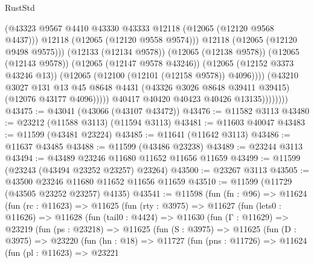 \begin{lexlean}{RustStd}
\begin{coremodule}
                                  (@43323
                                    @9567
                                    @4410
                                    @43330
                                    @43333
                                    @12118
                                    (@12065 (@12120 @9568 @4437)))
                                  @12118
                                  (@12065 (@12120 @9558 @9574)))
                                @12118
                                (@12065 (@12120 @9498 @9575)))
                              (@12133 (@12134 @9578))
                              (@12065 (@12138 @9578))
                              (@12065 (@12143 @9578))
                              (@12065 (@12147 @9578 @43246))
                              (@12065 (@12152 @3373 @43246 @13))
                              (@12065 (@12100 (@12101 (@12158 @9578)) @4096))))
                          (@43210
                            @3027
                            @131
                            @13
                            @45
                            @8648
                            @4431
                            (@43326 @3026 @8648 @39411 @39415)
                            (@12076 @43177 @4096)))))
                    @40417
                    @40420
                    @40423
                    @40426
                    @13135))))))))
@43475 := @43041 (@43066 (@43107 @43472))
@43476 := @11582 @3113
@43480 := @23212 (@11588 @3113) (@11594 @3113)
@43481 := @11603 @40047
@43483 := @11599 (@43481 @23224)
@43485 := @11641 (@11642 @3113)
@43486 := @11637 @43485
@43488 := @11599 (@43486 @23238)
@43489 := @23244 @3113
@43494 := @43489 @23246 @11680 @11652 @11656 @11659
@43499 := @11599 (@23243 (@43494 @23252 @23257) @23264)
@43500 := @23267 @3113
@43505 := @43500 @23246 @11680 @11652 @11656 @11659
@43510 := @11599 (@11729 (@43505 @23252 @23257) @4135)
@43541 := @11598
    (fun (fn : @96) =>
    @11624
      (fun (rc : @11623) =>
      @11625
        (fun (rty : @3975) =>
        @11627
          (fun (lets0 : @11626) =>
          @11628
            (fun (tail0 : @4424) =>
            @11630
              (fun (Γ : @11629) =>
              @23219
                (fun (ps : @23218) =>
                @11625
                  (fun (S : @3975) =>
                  @11625
                    (fun (D : @3975) =>
                    @23220
                      (fun (hn : @18) =>
                      @11727
                        (fun (pns : @11726) =>
                        @11624
                          (fun (pl : @11623) =>
                          @23221

\end{coremodule}
\end{lexlean}
